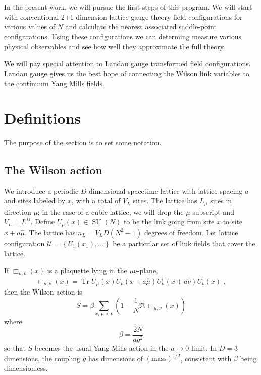 \documentclass[preprint,aps,prd]{revtex4-2}
\newcommand{\da}{\dagger}  %
\newcommand{\be}{\begin{equation}}
\newcommand{\eq}{\end{equation}}
\newcommand{\plaquette}{\Box}
\newcommand{\config}{\mathcal{U}}
\DeclareMathOperator{\SU}{SU}
\DeclareMathOperator{\Tr}{Tr}
\begin{document}
In the present work, we will pursue the first steps of this program.
We will start with conventional 2+1 dimension lattice gauge
theory field configurations for various values of $N$ and
calculate the nearest associated saddle-point configurations.
Using these configurations we can determing  measure various
physical observables and see how well they approximate the
full theory.

We will pay special attention to Landau gauge transformed
field configurations.  Landau gauge gives us the best hope
of connecting the Wilson link variables to the continuum
Yang Mills fields.

\section{Definitions}

The purpose of the section is to set some notation.

\subsection{The Wilson action}

We introduce a periodic $D$-dimensional spacetime lattice with lattice
spacing $a$ and sites labeled by $x$, with a total of $V_L$ sites.
The lattice has $L_\mu$ sites in direction $\mu$;
in the case of a cubic lattice, we will drop the $\mu$ subscript
and $V_L = L^D$.
Define $U_\mu(x) \in \SU(N)$ to be the link going from site $x$ to
site $x+a \hat{\mu}$.
The lattice has $n_L=V_L D \left(N^2-1\right)$ degrees of freedom.
Let lattice configuration
$\config=\left\{U_1(x_1),\ldots\right\}$
be a particular set of link fields that cover the lattice.

If $\plaquette_{\mu,\nu}(x)$ is a plaquette lying in the $\mu\nu$-plane,
\be
\plaquette_{\mu,\nu}(x) = \Tr U_\mu(x) U_\nu(x+a \hat{\mu})
U_\mu^\da(x+a\hat{\nu}) U_\nu^\da(x) \; ,
\eq
then the Wilson action is
%
\be
S = \beta \sum_{x,\, \mu<\nu} \left(1-\frac{1}{N} \Re\, \plaquette_{\mu,\nu}(x)\right) \label{action}
\eq
where
\be
\beta=\frac{2 N}{a g^2}
\eq
so that $S$ becomes the usual Yang-Mills action in the $a\to 0$ limit.
In $D=3$ dimensions, the coupling $g$ has dimensions of
$\left(\mbox{mass}\right)^{1/2}$, consistent with $\beta$ being dimensionless.
\end{document}
